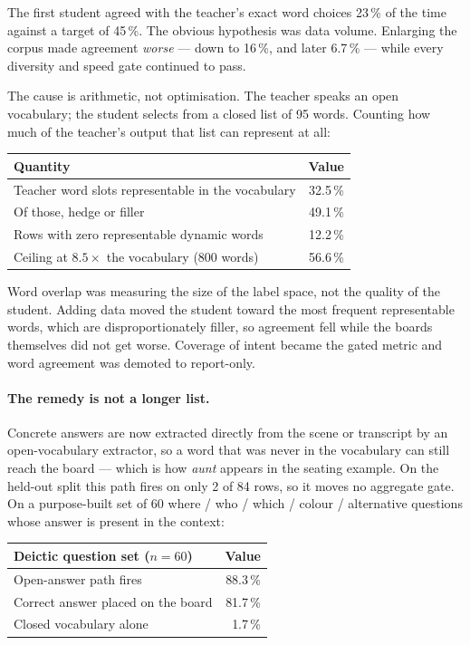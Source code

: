 \documentclass[11pt,a4paper]{article}
\begin{document}
The first student agreed with the teacher's exact word choices 23\,\% of the time
against a target of 45\,\%. The obvious hypothesis was data volume. Enlarging the corpus
made agreement \emph{worse} --- down to 16\,\%, and later 6.7\,\% --- while every
diversity and speed gate continued to pass.

The cause is arithmetic, not optimisation. The teacher speaks an open vocabulary; the
student selects from a closed list of 95 words. Counting how much of the teacher's
output that list can represent at all:

\begin{center}
\begin{tabular}{@{}lr@{}}
\toprule
\textbf{Quantity} & \textbf{Value} \\
\midrule
Teacher word slots representable in the vocabulary & 32.5\,\% \\
Of those, hedge or filler                          & 49.1\,\% \\
Rows with zero representable dynamic words         & 12.2\,\% \\
Ceiling at $8.5\times$ the vocabulary (800 words)  & 56.6\,\% \\
\bottomrule
\end{tabular}
\end{center}

Word overlap was measuring the size of the label space, not the quality of the student.
Adding data moved the student toward the most frequent representable words, which are
disproportionately filler, so agreement fell while the boards themselves did not get
worse. Coverage of intent became the gated metric and word agreement was demoted to
report-only.

\paragraph{The remedy is not a longer list.} Concrete answers are now extracted directly
from the scene or transcript by an open-vocabulary extractor, so a word that was never in
the vocabulary can still reach the board --- which is how \emph{aunt} appears in the
seating example. On the held-out split this path fires on only 2 of 84 rows, so it moves
no aggregate gate. On a purpose-built set of 60 where / who / which / colour /
alternative questions whose answer is present in the context:

\begin{center}
\begin{tabular}{@{}lr@{}}
\toprule
\textbf{Deictic question set ($n=60$)} & \textbf{Value} \\
\midrule
Open-answer path fires                 & 88.3\,\% \\
Correct answer placed on the board     & 81.7\,\% \\
Closed vocabulary alone                & 1.7\,\% \\
\bottomrule
\end{tabular}
\end{center}
\end{document}
